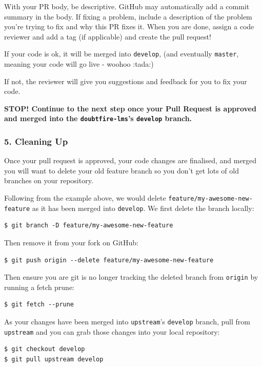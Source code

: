 \documentclass[12pt,a4paper,]{article}
\begin{document}
With your PR body, be descriptive. GitHub may automatically add a commit
summary in the body. If fixing a problem, include a description of the
problem you're trying to fix and why this PR fixes it. When you are
done, assign a code reviewer and add a tag (if applicable) and create
the pull request!

If your code is ok, it will be merged into \texttt{develop}, (and
eventually \texttt{master}, meaning your code will go live - woohoo
:tada:)

If not, the reviewer will give you suggestions and feedback for you to
fix your code.

\textbf{STOP! Continue to the next step once your Pull Request is
approved and merged into the \texttt{doubtfire-lms}'s \texttt{develop}
branch.}

\subsubsection{5. Cleaning Up}\label{cleaning-up}

Once your pull request is approved, your code changes are finalised, and
merged you will want to delete your old feature branch so you don't get
lots of old branches on your repository.

Following from the example above, we would delete
\texttt{feature/my-awesome-new-feature} as it has been merged into
\texttt{develop}. We first delete the branch locally:

\begin{verbatim}
$ git branch -D feature/my-awesome-new-feature
\end{verbatim}

Then remove it from your fork on GitHub:

\begin{verbatim}
$ git push origin --delete feature/my-awesome-new-feature
\end{verbatim}

Then ensure you are git is no longer tracking the deleted branch from
\texttt{origin} by running a fetch prune:

\begin{verbatim}
$ git fetch --prune
\end{verbatim}

As your changes have been merged into \texttt{upstream}'s
\texttt{develop} branch, pull from \texttt{upstream} and you can grab
those changes into your local repository:

\begin{verbatim}
$ git checkout develop
$ git pull upstream develop
\end{verbatim}
\end{document}
